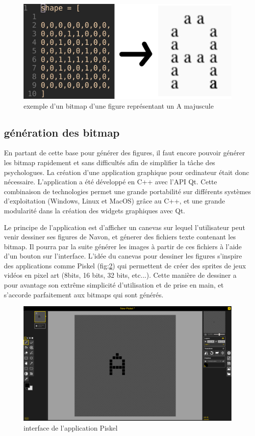 \documentclass{article}
\begin{document}
\begin{figure}[!h]
	\centering
	\includegraphics[scale=0.9]{./images/txt_to_image.png}
	\caption{exemple d'un bitmap d'une figure représentant un A majuscule}
	\label{fig:bitarray}
\end{figure}

\subsection{génération des bitmap}

En partant de cette base pour générer des figures, il faut encore pouvoir générer les bitmap rapidement et sans difficultés afin de simplifier la tâche des psychologues. La création d'une application graphique pour ordinateur était donc nécessaire. L'application a été développé en C++ avec l'API Qt. Cette combinaison de technologies permet une grande portabilité sur différents systèmes d'exploitation (Windows, Linux et MacOS) grâce au C++, et une grande modularité dans la création des widgets graphiques avec Qt. 

Le principe de l'application est d'afficher un canevas sur lequel l'utilisateur peut venir dessiner ses figures de Navon, et génerer des fichiers texte contenant les bitmap. Il pourra par la suite générer les images à partir de ces fichiers à l'aide d'un bouton sur l'interface. 
L'idée du canevas pour dessiner les figures s'inspire des applications comme Piskel (fig:\ref{fig:Piskel}) qui permettent de créer des sprites de jeux vidéos en pixel art (8bits, 16 bits, 32 bits, etc...). Cette manière de dessiner a pour avantage son extrême simplicité d'utilisation et de prise en main, et s'accorde parfaitement aux bitmaps qui sont générés.

\begin{figure}[!h]
	\centering
	\includegraphics[scale=0.2]{./images/piskel.png}
	\caption{interface de l'application Piskel}
	\label{fig:Piskel}
\end{figure}
\end{document}
